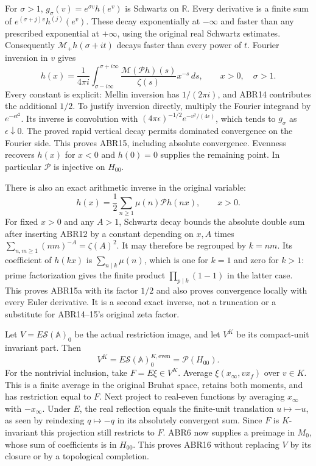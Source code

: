 For $\sigma>1$, $g_\sigma(v)=e^{\sigma v}h(e^v)$ is Schwartz
on $\mathbb R$. Every derivative is a finite sum of
$e^{(\sigma+j)v}h^{(j)}(e^v)$. These decay exponentially at
$-\infty$ and faster than any prescribed exponential at
$+\infty$, using the original real Schwartz estimates.
Consequently $\mathcal M_+h(\sigma+it)$ decays faster than
every power of $t$. Fourier inversion in $v$ gives
\begin{equation}\tag{ABR15}
 h(x)=\frac1{4\pi i}
   \int_{\sigma-i\infty}^{\sigma+i\infty}
      \frac{\mathcal M(\mathcal P h)(s)}{\zeta(s)}x^{-s}\,ds,
       \qquad x>0,\quad\sigma>1.
\end{equation}
Every constant is explicit: Mellin inversion has $1/(2\pi i)$,
and ABR14 contributes the additional $1/2$. To justify inversion
directly, multiply the Fourier integrand by $e^{-\epsilon t^2}$.
Its inverse is convolution with
$(4\pi\epsilon)^{-1/2}e^{-v^2/(4\epsilon)}$, which tends to
$g_\sigma$ as $\epsilon\downarrow0$. The proved rapid vertical
decay permits dominated convergence on the Fourier side. This
proves ABR15, including absolute convergence. Evenness recovers
$h(x)$ for $x<0$ and $h(0)=0$ supplies the remaining point.
In particular $\mathcal P$ is injective on $H_{00}$.

There is also an exact arithmetic inverse in the original variable:
\begin{equation}\tag{ABR15a}
 h(x)=\frac12\sum_{n\ge1}\mu(n)\mathcal P h(nx),\qquad x>0.
\end{equation}
For fixed $x>0$ and any $A>1$, Schwartz decay bounds the absolute
double sum after inserting ABR12 by a constant depending on $x,A$
times $\sum_{n,m\ge1}(nm)^{-A}=\zeta(A)^2$.
It may therefore be regrouped by $k=nm$. Its coefficient of $h(kx)$
is $\sum_{n\mid k}\mu(n)$, which is one for $k=1$ and zero for
$k>1$: prime factorization gives the finite product
$\prod_{p\mid k}(1-1)$ in the latter case. This proves ABR15a
with its factor $1/2$ and also proves convergence locally with
every Euler derivative. It is a second exact inverse, not a
truncation or a substitute for ABR14--15's original zeta factor.

Let $V=E\mathcal S(\mathbb A)_0$ be the actual restriction image,
and let $V^K$ be its compact-unit invariant part. Then
\begin{equation}\tag{ABR16}
 V^K=E\mathcal S(\mathbb A)_0^{K,\mathrm{even}}
      =\mathcal P(H_{00}).
\end{equation}
For the nontrivial inclusion, take $F=E\xi\in V^K$. Average
$\xi(x_\infty,vx_f)$ over $v\in K$. This is a finite average
in the original Bruhat space, retains both moments, and has
restriction equal to $F$. Next project to real-even functions
by averaging $x_\infty$ with $-x_\infty$. Under $E$, the real
reflection equals the finite-unit translation $u\mapsto-u$,
as seen by reindexing $q\mapsto-q$ in its absolutely convergent
sum. Since $F$ is $K$-invariant this projection still restricts
to $F$. ABR6 now supplies a preimage in $M_0$, whose sum of
coefficients is in $H_{00}$. This proves ABR16 without replacing
$V$ by its closure or by a topological completion.

